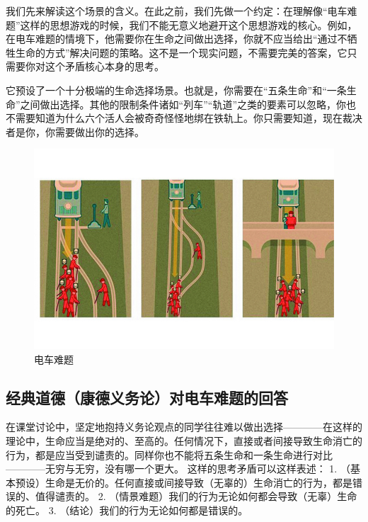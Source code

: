 \documentclass[10pt]{article}
\begin{document}
   我们先来解读这个场景的含义。在此之前，我们先做一个约定：在理解像“电车难题”这样的思想游戏的时候，我们不能无意义地避开这个思想游戏的核心。例如，在电车难题的情境下，他需要你在生命之间做出选择，你就不应当给出“通过不牺牲生命的方式”解决问题的策略。这不是一个现实问题，不需要完美的答案，它只需要你对这个矛盾核心本身的思考。
   
   它预设了一个十分极端的生命选择场景。也就是，你需要在“五条生命”和“一条生命”之间做出选择。其他的限制条件诸如“列车”“轨道”之类的要素可以忽略，你也不需要知道为什么六个活人会被奇奇怪怪地绑在铁轨上。你只需要知道，现在裁决者是你，你需要做出你的选择。
   
    
 \begin{figure}[h]
\centering
\includegraphics[width=.9\linewidth]{figs/电车难题示意图.jpeg}
\caption{电车难题} 
\label{fig:example}
\end{figure}
 
   
    \subsection{经典道德（康德义务论）对电车难题的回答}
    在课堂讨论中，坚定地抱持义务论观点的同学往往难以做出选择————在这样的理论中，生命应当是绝对的、至高的。任何情况下，直接或者间接导致生命消亡的行为，都是应当受到谴责的。同样你也不能将五条生命和一条生命进行对比————无穷与无穷，没有哪一个更大。
    这样的思考矛盾可以这样表述：
    1. （基本预设）生命是无价的。任何直接或间接导致（无辜的）生命消亡的行为，都是错误的、值得谴责的。
    2. （情景难题）我们的行为无论如何都会导致（无辜）生命的死亡。
    3. （结论）我们的行为无论如何都是错误的。
\end{document}
